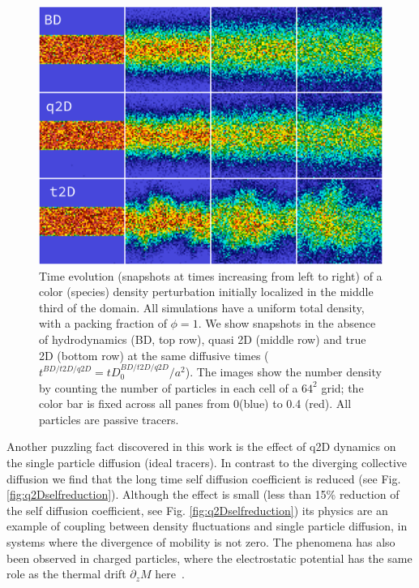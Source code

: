 \documentclass[ twoside,openright,titlepage,numbers=noenddot,%
headinclude,footinclude,cleardoublepage=empty,abstract=on,
BCOR=5mm,paper=b5,fontsize=11pt, dvipsnames
]{scrreprt}
\begin{document}
\begin{figure}[H]
  \centering
  \includegraphics[width=\linewidth]{gfx/q2Dcolorstripe}
  \caption{Time evolution (snapshots at times increasing from left to right) of a color (species) density perturbation initially localized in the middle third of the domain. All simulations have a uniform total density, with a packing fraction of $\phi = 1$. We show snapshots in the absence of hydrodynamics (BD, top row), quasi 2D (middle row) and true 2D (bottom row) at the same diffusive times ($t^{BD/t2D/q2D}= tD_0^{BD/t2D/q2D}/a^2$). The images show the number density by counting the number of particles in each cell of a $64^2$ grid; the color bar is fixed across all panes from 0(blue) to 0.4 (red). All particles are passive tracers.}
  \label{fig:q2Dcolorstripe}
\end{figure}

Another puzzling fact discovered in this work is the effect of q2D dynamics on the single particle diffusion (ideal tracers).
In contrast to the diverging collective diffusion we find that the long time self diffusion coefficient is reduced (see Fig. \ref{fig:q2Dselfreduction}). Although the effect is small (less than 15\% reduction of the self diffusion coefficient, see Fig. \ref{fig:q2Dselfreduction}) its physics are an example of coupling between density fluctuations and single particle diffusion, in systems where the divergence of mobility is not zero. The phenomena has also been observed in charged particles, where the electrostatic potential has the same role as the thermal drift $\partial_zM$ here~\cite{Pelaez2018}.
\end{document}
